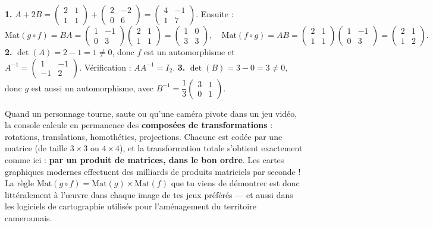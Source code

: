 \documentclass[11pt]{article}
\begin{document}
\begin{corrige}[Exercice 1]
\textbf{1.} $A + 2B = \begin{pmatrix} 2 & 1 \\ 1 & 1 \end{pmatrix} + \begin{pmatrix} 2 & -2 \\ 0 & 6 \end{pmatrix} = \begin{pmatrix} 4 & -1 \\ 1 & 7 \end{pmatrix}$. Ensuite :
\[ \mathrm{Mat}(g \circ f) = BA = \begin{pmatrix} 1 & -1 \\ 0 & 3 \end{pmatrix}\begin{pmatrix} 2 & 1 \\ 1 & 1 \end{pmatrix} = \begin{pmatrix} 1 & 0 \\ 3 & 3 \end{pmatrix}, \quad \mathrm{Mat}(f \circ g) = AB = \begin{pmatrix} 2 & 1 \\ 1 & 1 \end{pmatrix}\begin{pmatrix} 1 & -1 \\ 0 & 3 \end{pmatrix} = \begin{pmatrix} 2 & 1 \\ 1 & 2 \end{pmatrix}. \]
\textbf{2.} $\det(A) = 2 - 1 = 1 \neq 0$, donc $f$ est un automorphisme et $A^{-1} = \begin{pmatrix} 1 & -1 \\ -1 & 2 \end{pmatrix}$. Vérification : $A A^{-1} = I_2$.
\textbf{3.} $\det(B) = 3 - 0 = 3 \neq 0$, donc $g$ est aussi un automorphisme, avec $B^{-1} = \dfrac{1}{3}\begin{pmatrix} 3 & 1 \\ 0 & 1 \end{pmatrix}$.
\end{corrige}

\begin{savaistu}
Quand un personnage tourne, saute ou qu'une caméra pivote dans un jeu vidéo, la console calcule en permanence des \textbf{composées de transformations} : rotations, translations, homothéties, projections. Chacune est codée par une matrice (de taille $3\times 3$ ou $4\times 4$), et la transformation totale s'obtient exactement comme ici : \textbf{par un produit de matrices, dans le bon ordre}. Les cartes graphiques modernes effectuent des milliards de produits matriciels par seconde ! La règle $\mathrm{Mat}(g \circ f) = \mathrm{Mat}(g) \times \mathrm{Mat}(f)$ que tu viens de démontrer est donc littéralement à l'œuvre dans chaque image de tes jeux préférés — et aussi dans les logiciels de cartographie utilisés pour l'aménagement du territoire camerounais.
\end{savaistu}
\end{document}

